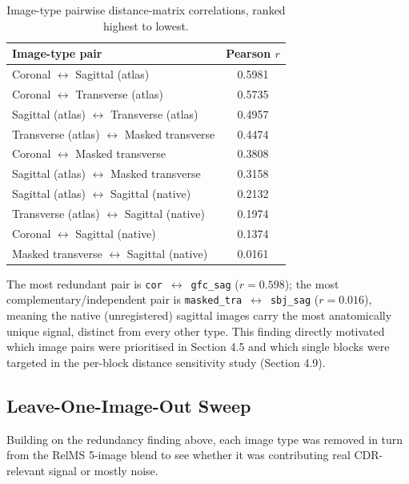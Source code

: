 \documentclass[11pt, a4paper]{article}
\begin{document}
\begin{table}[H]
\centering
\caption{Image-type pairwise distance-matrix correlations, ranked highest to lowest.}
\begin{tabular}{lc}
\toprule
\textbf{Image-type pair} & \textbf{Pearson $r$} \\
\midrule
Coronal $\leftrightarrow$ Sagittal (atlas) & 0.5981 \\
Coronal $\leftrightarrow$ Transverse (atlas) & 0.5735 \\
Sagittal (atlas) $\leftrightarrow$ Transverse (atlas) & 0.4957 \\
Transverse (atlas) $\leftrightarrow$ Masked transverse & 0.4474 \\
Coronal $\leftrightarrow$ Masked transverse & 0.3808 \\
Sagittal (atlas) $\leftrightarrow$ Masked transverse & 0.3158 \\
Sagittal (atlas) $\leftrightarrow$ Sagittal (native) & 0.2132 \\
Transverse (atlas) $\leftrightarrow$ Sagittal (native) & 0.1974 \\
Coronal $\leftrightarrow$ Sagittal (native) & 0.1374 \\
Masked transverse $\leftrightarrow$ Sagittal (native) & 0.0161 \\
\bottomrule
\end{tabular}
\end{table}

\noindent The most redundant pair is \texttt{cor}~$\leftrightarrow$~\texttt{gfc\_sag} ($r=0.598$);
the most complementary/independent pair is \texttt{masked\_tra}~$\leftrightarrow$~\texttt{sbj\_sag}
($r=0.016$), meaning the native (unregistered) sagittal images carry the most anatomically unique
signal, distinct from every other type. This finding directly motivated which image pairs were
prioritised in Section 4.5 and which single blocks were targeted in the per-block distance
sensitivity study (Section 4.9).

\subsection{Leave-One-Image-Out Sweep}

Building on the redundancy finding above, each image type was removed in turn from the RelMS
5-image blend to see whether it was contributing real CDR-relevant signal or mostly noise.
\end{document}
